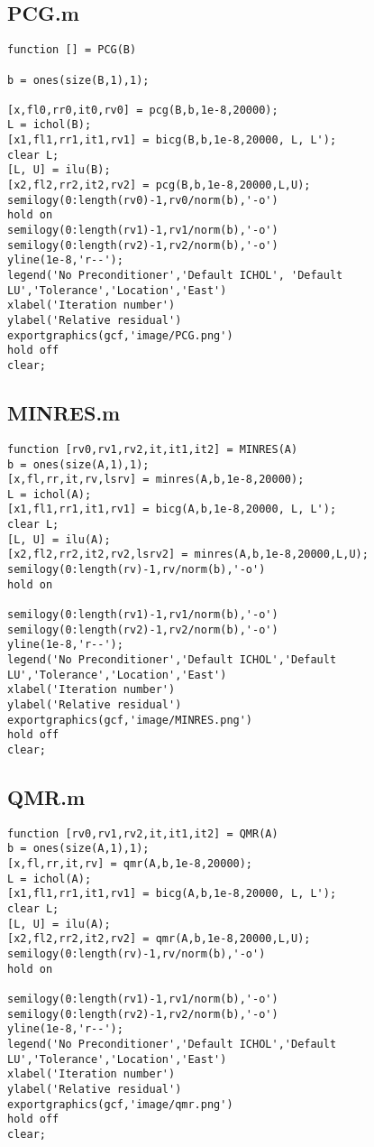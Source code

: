 \subsection*{PCG.m}
\begin{lstlisting}
function [] = PCG(B)

b = ones(size(B,1),1);

[x,fl0,rr0,it0,rv0] = pcg(B,b,1e-8,20000);
L = ichol(B);
[x1,fl1,rr1,it1,rv1] = bicg(B,b,1e-8,20000, L, L');
clear L;
[L, U] = ilu(B);
[x2,fl2,rr2,it2,rv2] = pcg(B,b,1e-8,20000,L,U);
semilogy(0:length(rv0)-1,rv0/norm(b),'-o')
hold on
semilogy(0:length(rv1)-1,rv1/norm(b),'-o')
semilogy(0:length(rv2)-1,rv2/norm(b),'-o')
yline(1e-8,'r--');
legend('No Preconditioner','Default ICHOL', 'Default LU','Tolerance','Location','East')
xlabel('Iteration number')
ylabel('Relative residual')
exportgraphics(gcf,'image/PCG.png')
hold off
clear;
\end{lstlisting}

\subsection*{MINRES.m}
\begin{lstlisting}
function [rv0,rv1,rv2,it,it1,it2] = MINRES(A)
b = ones(size(A,1),1);
[x,fl,rr,it,rv,lsrv] = minres(A,b,1e-8,20000);
L = ichol(A);
[x1,fl1,rr1,it1,rv1] = bicg(A,b,1e-8,20000, L, L');
clear L;
[L, U] = ilu(A);
[x2,fl2,rr2,it2,rv2,lsrv2] = minres(A,b,1e-8,20000,L,U);
semilogy(0:length(rv)-1,rv/norm(b),'-o')
hold on

semilogy(0:length(rv1)-1,rv1/norm(b),'-o')
semilogy(0:length(rv2)-1,rv2/norm(b),'-o')
yline(1e-8,'r--');
legend('No Preconditioner','Default ICHOL','Default LU','Tolerance','Location','East')
xlabel('Iteration number')
ylabel('Relative residual')
exportgraphics(gcf,'image/MINRES.png')
hold off
clear;
\end{lstlisting}

\subsection*{QMR.m}
\begin{lstlisting}
function [rv0,rv1,rv2,it,it1,it2] = QMR(A)
b = ones(size(A,1),1);
[x,fl,rr,it,rv] = qmr(A,b,1e-8,20000);
L = ichol(A);
[x1,fl1,rr1,it1,rv1] = bicg(A,b,1e-8,20000, L, L');
clear L;
[L, U] = ilu(A);
[x2,fl2,rr2,it2,rv2] = qmr(A,b,1e-8,20000,L,U);
semilogy(0:length(rv)-1,rv/norm(b),'-o')
hold on

semilogy(0:length(rv1)-1,rv1/norm(b),'-o')
semilogy(0:length(rv2)-1,rv2/norm(b),'-o')
yline(1e-8,'r--');
legend('No Preconditioner','Default ICHOL','Default LU','Tolerance','Location','East')
xlabel('Iteration number')
ylabel('Relative residual')
exportgraphics(gcf,'image/qmr.png')
hold off
clear;
\end{lstlisting}

